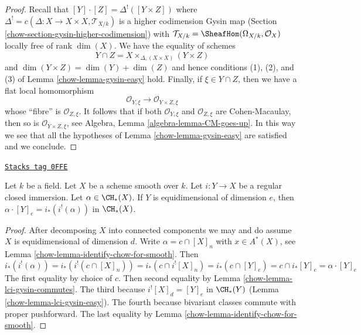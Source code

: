 \begin{proof}

Recall that $[Y] \cdot [Z] = \Delta^!([Y \times Z])$ where
$\Delta^! = c(\Delta : X \to X \times X, \mathcal{T}_{X/k})$
is a higher codimension Gysin map
(Section \ref{chow-section-gysin-higher-codimension}) with
$\mathcal{T}_{X/k} = \SheafHom(\Omega_{X/k}, \mathcal{O}_X)$
locally free of rank $\dim(X)$. We have the equality of schemes
$$
Y \cap Z = X \times_{\Delta, (X \times X)} (Y \times Z)
$$
and $\dim(Y \times Z) = \dim(Y) + \dim(Z)$ and hence conditions
(1), (2), and (3) of Lemma \ref{chow-lemma-gysin-easy} hold.
Finally, if $\xi \in Y \cap Z$, then we have a flat local
homomorphism
$$
\mathcal{O}_{Y, \xi} \longrightarrow
\mathcal{O}_{Y \times Z, \xi}
$$
whose ``fibre'' is $\mathcal{O}_{Z, \xi}$. It follows that if both
$\mathcal{O}_{Y, \xi}$ and $\mathcal{O}_{Z, \xi}$
are Cohen-Macaulay, then so is $\mathcal{O}_{Y \times Z, \xi}$, see
Algebra, Lemma \ref{algebra-lemma-CM-goes-up}.
In this way we see that all the hypotheses of
Lemma \ref{chow-lemma-gysin-easy} are satisfied and we conclude.
\end{proof}

\begin{lemma}
\label{chow-lemma-intersect-regularly-embedded}
\href{https://stacks.math.columbia.edu/tag/0FFE}{\texttt{Stacks tag 0FFE}}

Let $k$ be a field. Let $X$ be a scheme smooth over $k$. Let $i : Y \to X$ be
a regular closed immersion. Let $\alpha \in \CH_*(X)$. If $Y$ is
equidimensional of dimension $e$, then
$\alpha \cdot [Y]_e = i_*(i^!(\alpha))$ in $\CH_*(X)$.
\end{lemma}

\begin{proof}

After decomposing $X$ into connected components we may and do assume $X$
is equidimensional of dimension $d$. Write $\alpha = c \cap [X]_n$
with $x \in A^*(X)$, see Lemma \ref{chow-lemma-identify-chow-for-smooth}. Then
$$
i_*(i^!(\alpha)) = i_*(i^!(c \cap [X]_n)) =
i_*(c \cap i^![X]_n) = i_*(c \cap [Y]_e) =
c \cap i_*[Y]_e = \alpha \cdot [Y]_e
$$
The first equality by choice of $c$. Then second equality by
Lemma \ref{chow-lemma-lci-gysin-commutes}. The third because
$i^![X]_d = [Y]_e$ in $\CH_*(Y)$ (Lemma \ref{chow-lemma-lci-gysin-easy}).
The fourth because bivariant classes commute with proper pushforward.
The last equality by Lemma \ref{chow-lemma-identify-chow-for-smooth}.
\end{proof}

